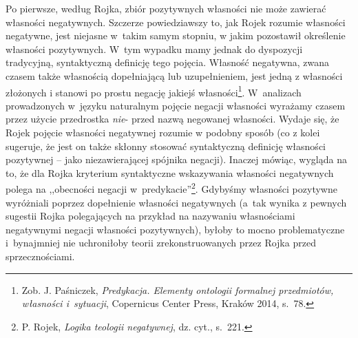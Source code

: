 Po pierwsze, według Rojka, zbiór pozytywnych własności nie może zawierać
własności negatywnych. Szczerze powiedziawszy to, jak Rojek rozumie własności negatywne, jest niejasne
w~takim samym stopniu, w jakim pozostawił określenie własności pozytywnych. W~tym wypadku
mamy jednak do dyspozycji tradycyjną, syntaktyczną definicję tego pojęcia.
Własność negatywna, zwana czasem także własnością dopełniającą lub uzupełnieniem, jest
jedną z własności złożonych i stanowi po prostu negację jakiejś
własności\footnote{Zob. J. Paśniczek, \textit{Predykacja. Elementy ontologii formalnej przedmiotów, własności i~sytuacji}, Copernicus
Center Press, Kraków 2014, s.~78.}. W~analizach prowadzonych
w~języku naturalnym pojęcie negacji własności wyrażamy czasem przez użycie
przedrostka \textit{nie}-  przed nazwą negowanej własności. Wydaje się, że Rojek pojęcie
własności negatywnej rozumie w podobny sposób (co z kolei sugeruje, że jest on także skłonny
stosować syntaktyczną definicję własności pozytywnej -- jako
niezawierającej spójnika negacji).
Inaczej mówiąc, wygląda na to, że dla Rojka kryterium
syntaktyczne wskazywania własności negatywnych polega na ,,obecności negacji w~predykacie''\footnote{P. Rojek, \textit{Logika teologii negatywnej}, dz. cyt., s.~221. }. Gdybyśmy własności pozytywne wyróżniali poprzez dopełnienie własności negatywnych (a~tak wynika z pewnych sugestii Rojka polegających na przykład  na nazywaniu własnościami negatywnymi negacji własności pozytywnych), byłoby to mocno problematyczne i~bynajmniej nie uchroniłoby
teorii zrekonstruowanych przez Rojka przed sprzecznościami.

